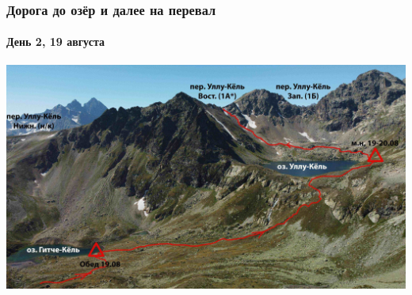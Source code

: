 \begin{frame}
	\frametitle{Дорога до озёр и далее на перевал}
	\framesubtitle{День 2, 19 августа}
	\centering
	\includegraphics[width=\linewidth]{../pics/ullu_kuel_route}
\end{frame}